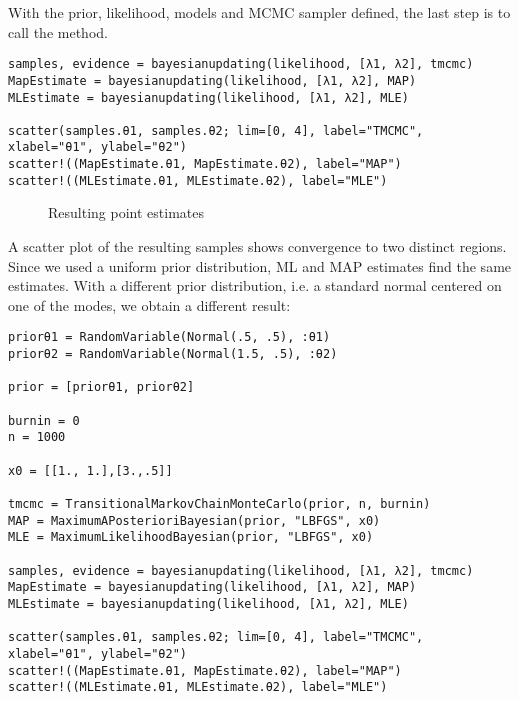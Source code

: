 With the prior, likelihood, models and  MCMC sampler defined, the last step is to call the  method.




\begin{verbatim}
samples, evidence = bayesianupdating(likelihood, [λ1, λ2], tmcmc)
MapEstimate = bayesianupdating(likelihood, [λ1, λ2], MAP)
MLEstimate = bayesianupdating(likelihood, [λ1, λ2], MLE)

scatter(samples.θ1, samples.θ2; lim=[0, 4], label="TMCMC", xlabel="θ1", ylabel="θ2")
scatter!((MapEstimate.θ1, MapEstimate.θ2), label="MAP")
scatter!((MLEstimate.θ1, MLEstimate.θ2), label="MLE")
\end{verbatim}



\begin{figure}
\centering
{}
\caption{Resulting point estimates}
\end{figure}
  A scatter plot of the resulting samples shows convergence to two distinct regions. Since we used a uniform prior distribution, ML and MAP estimates find the same estimates. With a different prior distribution, i.e. a standard normal centered on one of the modes, we obtain a different result:




\begin{verbatim}
priorθ1 = RandomVariable(Normal(.5, .5), :θ1)
priorθ2 = RandomVariable(Normal(1.5, .5), :θ2)

prior = [priorθ1, priorθ2]

burnin = 0
n = 1000

x0 = [[1., 1.],[3.,.5]]

tmcmc = TransitionalMarkovChainMonteCarlo(prior, n, burnin)
MAP = MaximumAPosterioriBayesian(prior, "LBFGS", x0)
MLE = MaximumLikelihoodBayesian(prior, "LBFGS", x0)

samples, evidence = bayesianupdating(likelihood, [λ1, λ2], tmcmc)
MapEstimate = bayesianupdating(likelihood, [λ1, λ2], MAP)
MLEstimate = bayesianupdating(likelihood, [λ1, λ2], MLE)

scatter(samples.θ1, samples.θ2; lim=[0, 4], label="TMCMC", xlabel="θ1", ylabel="θ2")
scatter!((MapEstimate.θ1, MapEstimate.θ2), label="MAP")
scatter!((MLEstimate.θ1, MLEstimate.θ2), label="MLE")
\end{verbatim}



